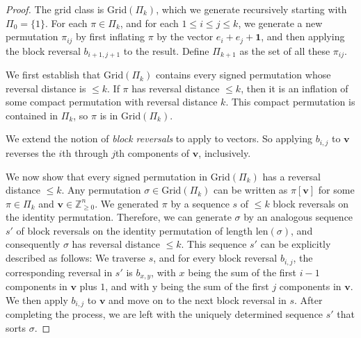 \documentclass{article}
\numberwithin{equation}{section}
\theoremstyle{definition}
\newcommand{\V}{\textbf{v}}
\newcommand{\one}{\textbf{1}}
\newcommand{\Grid}{\text{Grid}}
\newcommand{\len}{\text{len}}
\begin{document}
\begin{proof}
The grid class is $\Grid(\Pi_k)$, which we generate recursively starting with $\Pi_0 = \{1\}$.  For each $\pi\in\Pi_k$, and for each $1\leq i \leq j \leq k$, we generate a new permutation $\pi_{ij}$ by first inflating $\pi$ by the vector $e_i + e_j + \one$, and then applying the block reversal $b_{i+1,j+1}$ to the result.  Define $\Pi_{k+1}$ as the set of all these $\pi_{ij}$.

We first establish that $\Grid(\Pi_k)$ contains every signed permutation whose reversal distance is $\leq k$.  If $\pi$ has reversal distance $\leq k$, then it is an inflation of some compact permutation with reversal distance $k$. This compact permutation is contained in $\Pi_k$, so $\pi$ is in $\Grid(\Pi_k)$.

We extend the notion of \emph{block reversals} to apply to vectors.  So applying $b_{i,j}$  to $\V$ reverses the $i$th through $j$th components of $\V$, inclusively.

We now show that every signed permutation in $\Grid(\Pi_k)$ has a reversal distance $\leq k$.  Any permutation $\sigma\in\Grid(\Pi_k)$ can be written as $\pi[\V]$ for some $\pi\in\Pi_k$ and $\V\in\mathbb{Z}^{n}_{\geq0}$.  We generated $\pi$ by a sequence $s$ of $\leq k$ block reversals on the identity permutation.  Therefore, we can generate $\sigma$ by an analogous sequence $s'$ of block reversals on the identity permutation of length $\len(\sigma)$, and consequently $\sigma$ has reversal distance $\leq k$.  This sequence $s'$ can be explicitly described as follows: We traverse $s$, and for every block reversal $b_{i,j}$, the corresponding reversal in $s'$ is $b_{x,y}$, with $x$ being the sum of the first $i-1$ components in $\V$ plus $1$, and with y being the sum of the first $j$ components in $\V$.  We then apply $b_{i,j}$ to $\V$ and move on to the next block reversal in $s$.  After completing the process, we are left with the uniquely determined sequence $s'$ that  sorts $\sigma$.
%
%
\end{proof}
\end{document}
